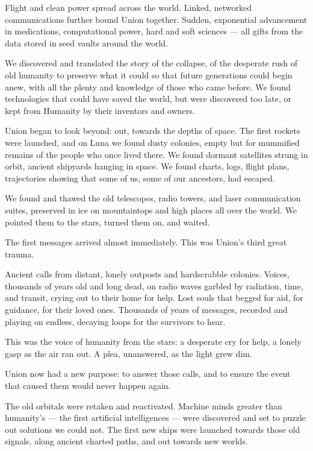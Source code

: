 Flight and clean power spread across the world. Linked, networked communications further
bound Union together. Sudden, exponential advancement in medications, computational power,
hard and soft sciences — all gifts from the data stored in seed vaults around the world.


We discovered and translated the story of the collapse, of the desperate rush of old humanity to
preserve what it could so that future generations could begin anew, with all the plenty and
knowledge of those who came before. We found technologies that could have saved the world,
but were discovered too late, or kept from Humanity by their inventors and owners.


Union began to look beyond: out, towards the depths of space. The first rockets were launched,
and on Luna we found dusty colonies, empty but for mummified remains of the people who once
lived there. We found dormant satellites strung in orbit, ancient shipyards hanging in space. We
found charts, logs, flight plans, trajectories showing that some of us, some of our ancestors, had
escaped.


We found and thawed the old telescopes, radio towers, and laser communication suites,
preserved in ice on mountaintops and high places all over the world. We pointed them to the
stars, turned them on, and waited.


The first messages arrived almost immediately. This was Union’s third great trauma.


Ancient calls from distant, lonely outposts and hardscrabble colonies. Voices, thousands of years
old and long dead, on radio waves garbled by radiation, time, and transit, crying out to their
home for help. Lost souls that begged for aid, for guidance, for their loved ones. Thousands of
years of messages, recorded and playing on endless, decaying loops for the survivors to hear.


This was the voice of humanity from the stars: a desperate cry for help, a lonely gasp as the air
ran out. A plea, unanswered, as the light grew dim.


Union now had a new purpose: to answer those calls, and to ensure the event that caused them
would never happen again.


The old orbitals were retaken and reactivated. Machine minds greater than humanity’s — the first
artificial intelligences — were discovered and set to puzzle out solutions we could not. The first
new ships were launched towards those old signals, along ancient charted paths, and out
towards new worlds.


